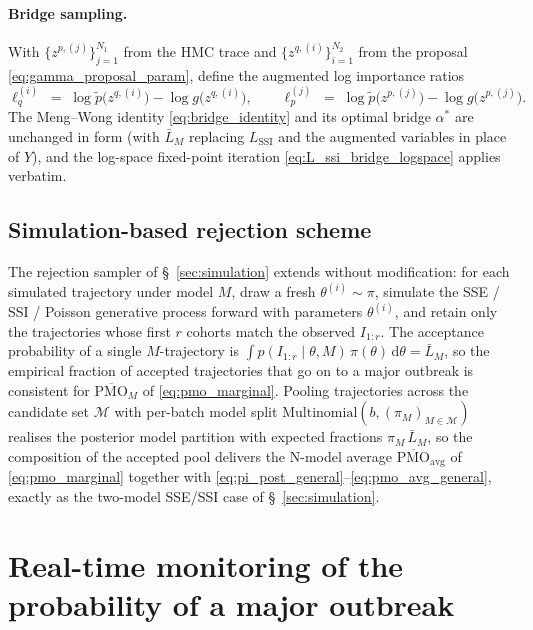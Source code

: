 \documentclass{article}
\theoremstyle{definition}
\begin{document}
\paragraph{Bridge sampling.}  With \(\{z^{p,(j)}\}_{j=1}^{N_1}\) from
the HMC trace and \(\{z^{q,(i)}\}_{i=1}^{N_2}\) from the proposal
\eqref{eq:gamma_proposal_param}, define the augmented log importance
ratios
\begin{equation*}
  \ell_q^{(i)} \;=\; \log \tilde p\bigl(z^{q,(i)}\bigr) -
                     \log g\bigl(z^{q,(i)}\bigr),
  \qquad
  \ell_p^{(j)} \;=\; \log \tilde p\bigl(z^{p,(j)}\bigr) -
                     \log g\bigl(z^{p,(j)}\bigr).
\end{equation*}
The Meng--Wong identity \eqref{eq:bridge_identity} and its optimal
bridge \(\alpha^*\) are unchanged in form (with \(\bar L_M\) replacing
\(L_{\mathrm{SSI}}\) and the augmented variables in place of \(Y\)),
and the log-space fixed-point iteration
\eqref{eq:L_ssi_bridge_logspace} applies verbatim.

\subsection{Simulation-based rejection scheme}

The rejection sampler of \S~\ref{sec:simulation} extends without
modification: for each simulated trajectory under model \(M\), draw a
fresh \(\theta^{(i)} \sim \pi\), simulate the SSE / SSI / Poisson
generative process forward with parameters \(\theta^{(i)}\), and retain
only the trajectories whose first \(r\) cohorts match the observed
\(I_{1:r}\).  The acceptance probability of a single \(M\)-trajectory is
\(\int p(I_{1:r} \mid \theta, M)\, \pi(\theta)\, \mathrm{d}\theta =
  \bar L_M\), so the empirical fraction of accepted trajectories that
go on to a major outbreak is consistent for
\(\overline{\mathrm{PMO}}_M\) of \eqref{eq:pmo_marginal}.  Pooling
trajectories across the candidate set \(\mathcal{M}\) with per-batch
model split \(\mathrm{Multinomial}(b, (\pi_M)_{M \in \mathcal{M}})\)
realises the posterior model partition with expected fractions
\(\pi_M\,\bar L_M\), so the composition of the accepted pool delivers
the N-model average \(\overline{\mathrm{PMO}}_\mathrm{avg}\) of
\eqref{eq:pmo_marginal} together with
\eqref{eq:pi_post_general}--\eqref{eq:pmo_avg_general}, exactly as the
two-model SSE/SSI case of \S~\ref{sec:simulation}.

\section{Real-time monitoring of the probability of a major outbreak}
\label{sec:realtime}
\end{document}
